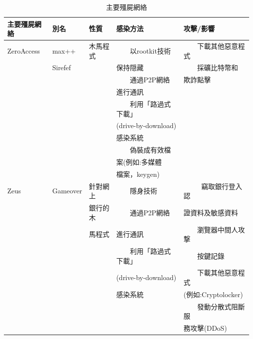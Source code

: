\documentclass[14pt]{extarticle}
\newcommand{\tabitem}{~~\llap{\textbullet}~~}
\begin{document}
\begin{table}[!htbp]
\centering
\caption{主要殭屍網絡}
\begin{tabular}{lllll} \hline
\bf 主要殭屍網絡 & \bf 別名 & \bf 性質 & \bf 感染方法 & \bf 攻擊/影響\\\hline
ZeroAccess	& max++ & 木馬程式 & \tabitem 以rootkit技術  & \tabitem 下載其他惡意程式 \\
& 	Sirefef & &	保持隠藏 & \tabitem 採礦比特幣和 \\
&&& \tabitem 通過P2P網絡 & 欺詐點擊\\
&&& 進行通訊\\
&&& \tabitem 利用「路過式下載」\\
&&& (drive-by-download)\\
&&& 感染系統\\
&&& \tabitem 偽裝成有效檔\\
&&& 案(例如:多媒體\\
&&& 檔案，keygen)	\\\hline
Zeus	& Gameover & 針對網上 & \tabitem 隱身技術  & \tabitem 	竊取銀行登入認 \\
& 	 & 銀行的木 &	\tabitem 通過P2P網絡& 證資料及敏感資料 \\
&&馬程式& 進行通訊 & \tabitem 瀏覽器中間人攻撃 \\
&&& \tabitem 利用「路過式下載」 & \tabitem 按鍵記錄\\
&&& (drive-by-download) & \tabitem 下載其他惡意程式\\
&&& 感染系統 & (例如:Cryptolocker)\\
&&&& \tabitem 發動分散式阻斷服 \\
&&&& 務攻擊(DDoS) \\\hline

\end{tabular}
\end{table}
\newpage
\end{document}
